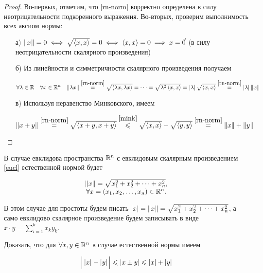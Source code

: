 \documentclass[../../main.tex]{subfiles}
\begin{document}
\begin{proof}
 Во-первых, отметим, что \eqref{rn-norm} корректно определена в силу 
 неотрицательности подкоренного выражения. Во-вторых, проверим
 выполнимость всех аксиом нормы:
 
 \begin{enumerate}
  \item[а)]
  $\lVert{x}\rVert = 0 \iff \sqrt{\left<x, x\right>} = 0 \iff
  \left<x, x\right> = 0 \implies x = \vec 0$ (в силу 
  неотрицательности скалярного произведения)
  
  \item[б)]
  Из линейности и симметричности скалярного произведения получаем
  
  $\forall \lambda \in \mathbb{R} \quad \forall x \in \mathbb{R}^n \quad
   \lVert{\lambda x}\rVert \stackrel{\eqref{rn-norm}}{=}
   \sqrt{\left<\lambda x, \lambda x\right>} = \dots =
   \sqrt{\lambda^2\left<x, x\right>} =
   \left|{\lambda}\right| \sqrt{\left<x, x\right>} \stackrel{\eqref{rn-norm}}{=}
   \left|{\lambda}\right| \lVert{x}\rVert$
 
  \item[в)]
  Используя неравенство Минковского, имеем
  
  $\lVert{x+y}\rVert \stackrel{\eqref{rn-norm}}{=}
   \sqrt{\left<x+y, x+y\right>} \stackrel{\eqref{mink}}{\leqslant}
   \sqrt{\left<x, x\right>} + \sqrt{\left<y, y\right>}
   \stackrel{\eqref{rn-norm}}{=} \lVert{x}\rVert + \lVert{y}\rVert$
 \end{enumerate}
 
\end{proof}

\begin{rem}
 В случае евклидова пространства $\mathbb{R}^n$ с евклидовым скалярным 
 произведением \eqref{eucl} естественной нормой будет
 
 \[\begin{array}{c}
    \lVert{x}\rVert = \sqrt{x_1^2 + x_2^2 + \dots + x_n^2}, \\
    \forall x = (x_1, x_2, \dots, x_n) \in \mathbb{R}^n.
   \end{array}\]
   
 В этом случае для простоты будем писать $\left|{x}\right| = \lVert{x}\rVert = 
 \sqrt{x_1^2 + x_2^2 + \dots + x_n^2}$, а само евклидово скалярное
 произведение будем записывать в виде $x\cdot y = \sum\limits_{i=1}^k 
 x_ky_k$.

\end{rem}

\begin{exc}
  Доказать, что для $\forall x, y \in \mathbb{R}^n$ в случае естественной нормы
  имеем
  
  \[\Big|\left|{x}\right| - \left|{y}\right|\Big| \leqslant \left|{x \pm y}\right| \leqslant 
  \left|{x}\right| + \left|{y}\right|\]
\end{exc}
\end{document}
